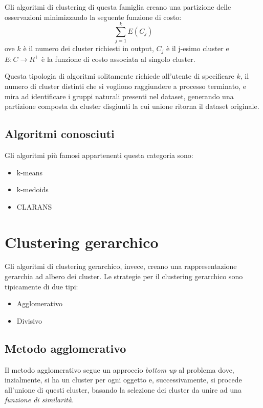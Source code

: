 	Gli algoritmi di clustering di questa famiglia creano una partizione delle osservazioni minimizzando la seguente funzione di costo:
	\begin{equation*}
	  \sum_{j=1}^{k}E(C_j)
	\end{equation*}
	ove $k$ è il numero dei cluster richiesti in output, $C_j$ è il j-esimo cluster e $E:C \rightarrow R^{+}$ è la funzione di costo associata al singolo cluster.

	Questa tipologia di algoritmi solitamente richiede all'utente di specificare $k$, il numero di cluster distinti che si vogliono raggiundere a processo terminato, e mira ad identificare i gruppi naturali presenti nel dataset, generando una partizione composta da cluster disgiunti la cui unione ritorna il dataset originale.
	
	\subsection{Algoritmi conosciuti}
		Gli algoritmi più famosi appartenenti questa categoria sono: 
		\begin{itemize}
		  	\item k-means
		  	\item k-medoids
		  	\item CLARANS
		\end{itemize}

\section{Clustering gerarchico}

	Gli algoritmi di clustering gerarchico, invece, creano una rappresentazione gerarchia ad albero dei cluster.
	Le strategie per il clustering gerarchico sono tipicamente di due tipi: 
	\begin{itemize}
		\item Agglomerativo
		\item Divisivo
	\end{itemize}
	
	\subsection{Metodo agglomerativo}
		Il metodo agglomerativo segue un approccio \emph{bottom up} al problema dove, inzialmente, si ha un cluster per ogni oggetto e, successivamente, si procede all'unione di questi cluster, basando la selezione dei cluster da unire ad una \emph{funzione di similarità}.


